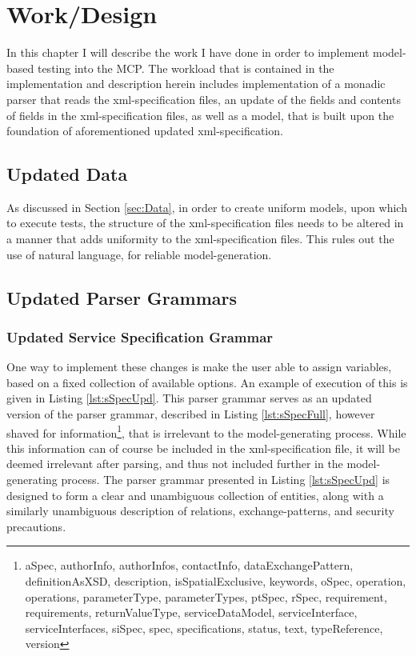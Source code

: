 \chapter{Work/Design}

In this chapter I will describe the work I have done in order to implement model-based testing into the MCP. The workload that is contained in the implementation and description herein includes implementation of a monadic parser that reads the xml-specification files, an update of the fields and contents of fields in the xml-specification files, as well as a model, that is built upon the foundation of aforementioned updated xml-specification. %
\section{Updated Data}

As discussed in Section \ref{sec:Data}, in order to create uniform models, upon which to execute tests, the structure of the xml-specification files needs to be altered in a manner that adds uniformity to the xml-specification files. This rules out the use of natural language, for reliable model-generation.



\section{Updated Parser Grammars}

\subsection{Updated Service Specification Grammar}

One way to implement these changes is make the user able to assign variables, based on a fixed collection of available options. An example of execution of this is given in Listing \ref{lst:sSpecUpd}. This parser grammar serves as an updated version of the parser grammar, described in Listing \ref{lst:sSpecFull}, however shaved for information\footnote{aSpec, authorInfo, authorInfos, contactInfo, dataExchangePattern, definitionAsXSD, description, isSpatialExclusive, keywords, oSpec, operation, operations, parameterType, parameterTypes, ptSpec, rSpec, requirement, requirements, returnValueType, serviceDataModel, serviceInterface, serviceInterfaces, siSpec, spec, specifications, status, text, typeReference, version}, that is irrelevant to the model-generating process. While this information can of course be included in the xml-specification file, it will be deemed irrelevant after parsing, and thus not included further in the model-generating process. The parser grammar presented in Listing \ref{lst:sSpecUpd} is designed to form a clear and unambiguous collection of entities, along with a similarly unambiguous description of relations, exchange-patterns, and security precautions. 

